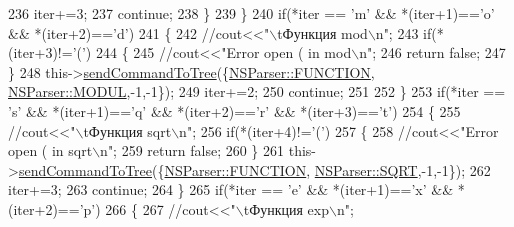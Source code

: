 \begin{DoxyCode}
236                         iter+=3;
237                         \textcolor{keywordflow}{continue};
238                     \}
239                 \}
240                 \textcolor{keywordflow}{if}(*iter == \textcolor{charliteral}{'m'} && *(iter+1)==\textcolor{charliteral}{'o'} && *(iter+2)==\textcolor{charliteral}{'d'})
241                 \{
242                     \textcolor{comment}{//cout<<"\(\backslash\)tФункция mod\(\backslash\)n";}
243                     \textcolor{keywordflow}{if}(*(iter+3)!=\textcolor{charliteral}{'('})
244                     \{
245                          \textcolor{comment}{//cout<<"Error open ( in mod\(\backslash\)n";}
246                          \textcolor{keywordflow}{return} \textcolor{keyword}{false};
247                     \}
248                     this->\hyperlink{classParser_ac61a1fedefe50ed900f0e65c029053c1}{sendCommandToTree}(\{\hyperlink{namespaceNSParser_aca012df556c0413c6166348fdd62c4eba4adabba7d2f386bba54639075a582a36}{NSParser::FUNCTION},
      \hyperlink{namespaceNSParser_aae20df1402d72f463a1a9efe3ce1a9b9ae8c0916769d2afe15d9edacaa3346851}{NSParser::MODUL},-1,-1\});
249                     iter+=2;
250                     \textcolor{keywordflow}{continue};
251 
252                 \}
253                 \textcolor{keywordflow}{if}(*iter == \textcolor{charliteral}{'s'} && *(iter+1)==\textcolor{charliteral}{'q'} && *(iter+2)==\textcolor{charliteral}{'r'} && *(iter+3)==\textcolor{charliteral}{'t'})
254                 \{
255                     \textcolor{comment}{//cout<<"\(\backslash\)tФункция sqrt\(\backslash\)n";}
256                     \textcolor{keywordflow}{if}(*(iter+4)!=\textcolor{charliteral}{'('})
257                     \{
258                          \textcolor{comment}{//cout<<"Error open ( in sqrt\(\backslash\)n";}
259                          \textcolor{keywordflow}{return} \textcolor{keyword}{false};
260                     \}
261                     this->\hyperlink{classParser_ac61a1fedefe50ed900f0e65c029053c1}{sendCommandToTree}(\{\hyperlink{namespaceNSParser_aca012df556c0413c6166348fdd62c4eba4adabba7d2f386bba54639075a582a36}{NSParser::FUNCTION},
      \hyperlink{namespaceNSParser_aae20df1402d72f463a1a9efe3ce1a9b9a4051b90258c729c4fdd863f44041a25b}{NSParser::SQRT},-1,-1\});
262                     iter+=3;
263                     \textcolor{keywordflow}{continue};
264                 \}
265                 \textcolor{keywordflow}{if}(*iter == \textcolor{charliteral}{'e'} && *(iter+1)==\textcolor{charliteral}{'x'} && *(iter+2)==\textcolor{charliteral}{'p'})
266                 \{
267                     \textcolor{comment}{//cout<<"\(\backslash\)tФункция exp\(\backslash\)n";}

\end{DoxyCode}
